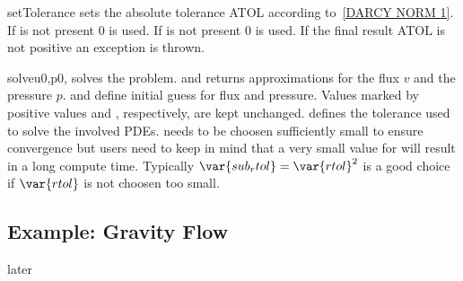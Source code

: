 \begin{methoddesc}[DarcyFlow]{setTolerance}{}
sets the absolute tolerance ATOL according to~\ref{DARCY NORM 1}. If  is not present $0$ is used. 
If  is not present $0$ is used. If the final result ATOL is not positive an exception is thrown. 
\end{methoddesc}



\begin{methoddesc}[DarcyFlow]{solve}{u0,p0, }
solves the problem. and returns approximations for the flux $v$ and the pressure $p$. 
 and  define initial guess for flux and pressure. Values marked
by positive values  and , respectively, are kept unchanged.
 defines the tolerance used to solve the involved PDEs.  needs to be choosen sufficiently small to ensure convergence but users need to keep in mind that a very small value for  will result in a long compute time. Typically  $\var{sub_rtol}=\var{rtol}^2$ is a good choice if $\var{rtol}$ is not choosen too small.
\end{methoddesc}


\subsection{Example: Gravity Flow}
later





